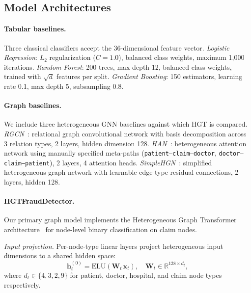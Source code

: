 \documentclass[pdflatex,sn-mathphys-num]{sn-jnl}
\theoremstyle{thmstyleone}
\theoremstyle{thmstyletwo}
\theoremstyle{thmstylethree}
\begin{document}
\subsection{Model Architectures}\label{sec:models}

\paragraph{Tabular baselines.}
Three classical classifiers accept the 36-dimensional feature vector.
\textit{Logistic Regression}: $L_2$ regularization ($C=1.0$), balanced
class weights, maximum 1,000 iterations.
\textit{Random Forest}: 200 trees, max depth 12, balanced class
weights, trained with $\sqrt{d}$ features per split.
\textit{Gradient Boosting}: 150 estimators, learning rate 0.1, max
depth 5, subsampling 0.8.

\paragraph{Graph baselines.}
We include three heterogeneous GNN baselines against which HGT is
compared. \textit{RGCN}~\cite{schlichtkrull2018}: relational graph
convolutional network with basis decomposition across 3 relation types,
2 layers, hidden dimension 128.
\textit{HAN}~\cite{wang2019han}: heterogeneous attention network using
manually specified meta-paths (\texttt{patient--claim--doctor},
\texttt{doctor--claim--patient}), 2 layers, 4 attention heads.
\textit{SimpleHGN}~\cite{lv2021}: simplified heterogeneous graph
network with learnable edge-type residual connections, 2 layers,
hidden 128.

\paragraph{HGTFraudDetector.}
Our primary graph model implements the Heterogeneous Graph Transformer
architecture~\cite{hu2020hgt} for node-level binary classification on
claim nodes.

\textit{Input projection.} Per-node-type linear layers project
heterogeneous input dimensions to a shared hidden space:
\begin{equation}
  \mathbf{h}_t^{(0)} = \text{ELU}\!\left(\mathbf{W}_t\,\mathbf{x}_t\right),
  \quad \mathbf{W}_t \in \mathbb{R}^{128 \times d_t},
\end{equation}
where $d_t \in \{4, 3, 2, 9\}$ for patient, doctor, hospital, and
claim node types respectively.
\end{document}
